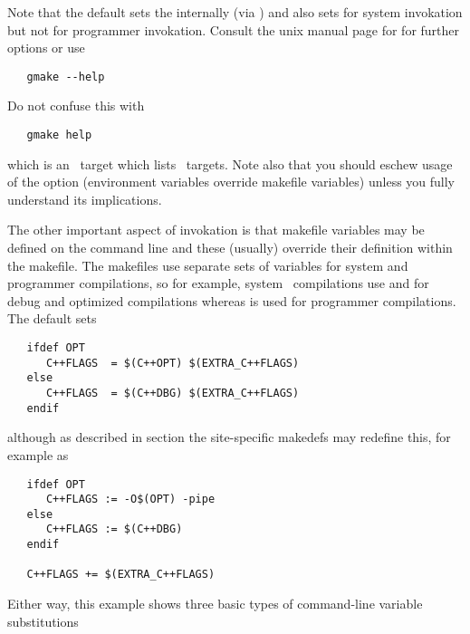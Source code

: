\noindent
Note that the default  sets the 
internally (via ) and also sets  for system invokation
but not for programmer invokation.  Consult the unix manual page for
 for further options or use

\begin{verbatim}
   gmake --help
\end{verbatim}

\noindent
Do not confuse this with

\begin{verbatim}
   gmake help
\end{verbatim}

\noindent
which is an \aipspp\ target which lists \aipspp\ targets.  Note also that you
should eschew usage of the  option (environment variables override
makefile variables) unless you fully understand its implications.

The other important aspect of  invokation is that makefile
variables may be defined on the command line and these (usually) override
their definition within the makefile.  The makefiles use separate sets of
variables for system and programmer compilations, so for example, system
\cplusplus\ compilations use  and  for debug and
optimized compilations whereas  is used for programmer
compilations.  The default  sets

\begin{verbatim}
   ifdef OPT
      C++FLAGS  = $(C++OPT) $(EXTRA_C++FLAGS)
   else
      C++FLAGS  = $(C++DBG) $(EXTRA_C++FLAGS)
   endif
\end{verbatim}

\noindent
although as described in section 
the site-specific makedefs may redefine this, for example as

\begin{verbatim}
   ifdef OPT
      C++FLAGS := -O$(OPT) -pipe
   else
      C++FLAGS := $(C++DBG)
   endif

   C++FLAGS += $(EXTRA_C++FLAGS)
\end{verbatim}

Either way, this example shows three basic types of command-line variable
substitutions

